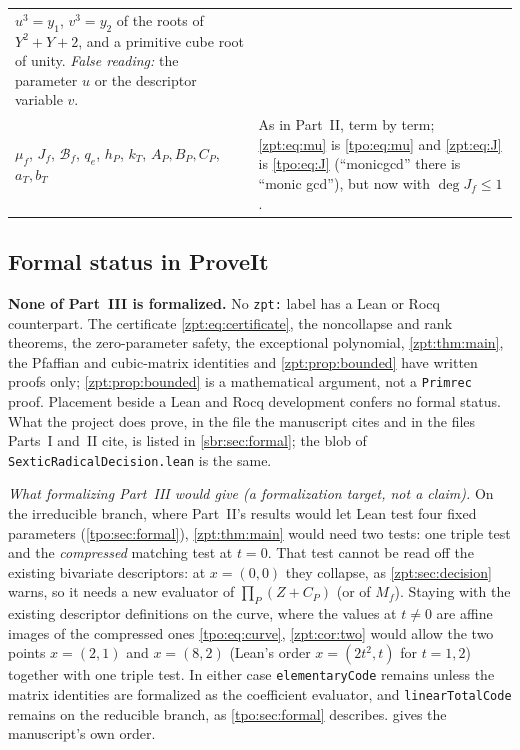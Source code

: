 \documentclass[11pt,letterpaper]{article}
\numberwithin{equation}{section}
\theoremstyle{definition}
\theoremstyle{remark}
\newcommand{\src}[1]{\texttt{\nolinkurl{#1}}}
\begin{document}
\begin{center}
\begin{longtable}{@{}>{\raggedright\arraybackslash}p{}
 >{\raggedright\arraybackslash}p{}@{}}
$u^3=y_1$, $v^3=y_2$ of the roots of $Y^2+Y+2$, and a primitive cube root of
unity. \emph{False reading:} the parameter $u$ or the descriptor variable
$v$.\\[3pt]
$\mu_f$, $J_f$, $\mathcal B_f$, $q_e$, $h_P$, $k_T$, $A_P,B_P,C_P$,
$a_T,b_T$ & As in Part~II, term by term; \eqref{zpt:eq:mu} is
\eqref{tpo:eq:mu} and \eqref{zpt:eq:J} is \eqref{tpo:eq:J} (``monicgcd''
there is ``monic gcd''), but now with $\deg J_f\le1$.\\
\end{longtable}
\end{center}

\subsection{Formal status in ProveIt}
\label{zpt:sec:formal}

\textbf{None of Part~III is formalized.} No \src{zpt:} label has a Lean or
Rocq counterpart. The certificate \eqref{zpt:eq:certificate}, the
noncollapse and rank theorems, the zero-parameter safety, the exceptional
polynomial, \cref{zpt:thm:main}, the Pfaffian and cubic-matrix identities and
\cref{zpt:prop:bounded} have written proofs only;
\cref{zpt:prop:bounded} is a mathematical argument, not a \src{Primrec}
proof. Placement beside a Lean and Rocq development confers no formal
status. What the project does prove, in the file the manuscript cites and
in the files Parts~I and~II cite, is listed in \cref{sbr:sec:formal}; the
blob of \src{SexticRadicalDecision.lean} is the same.

\emph{What formalizing Part~III would give (a formalization target, not a
claim).} On the irreducible branch, where Part~II's results would let Lean
test four fixed parameters (\cref{tpo:sec:formal}), \cref{zpt:thm:main}
would need two tests: one triple test and the \emph{compressed} matching
test at $t=0$. That test cannot be read off the existing bivariate
descriptors: at $x=(0,0)$ they collapse, as \cref{zpt:sec:decision}
warns, so it needs a new evaluator of $\prod_P(Z+C_P)$ (or of $M_f$).
Staying with the existing descriptor definitions on the curve, where the
values at $t\ne0$ are affine images of the compressed ones
\eqref{tpo:eq:curve}, \cref{zpt:cor:two} would allow the two points
$x=(2,1)$ and $x=(8,2)$ (Lean's order $x=(2t^2,t)$ for $t=1,2$) together
with one triple test. In either case \src{elementaryCode} remains unless the
matrix identities are formalized as the coefficient evaluator, and
\src{linearTotalCode} remains on the reducible branch, as
\cref{tpo:sec:formal} describes.
 gives the manuscript's own order.
\end{document}
